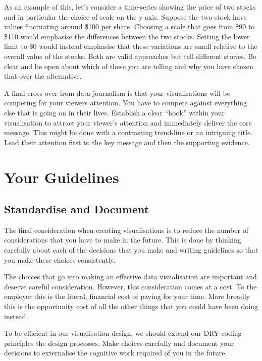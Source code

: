 \documentclass[
  12pt,
]{book}
\begin{document}
As an example of this, let's consider a time-series showing the price of two stocks and in particular the choice of scale on the y-axis. Suppose the two stock have values fluctuating around \$100 per share. Choosing a scale that goes from \$90 to \$110 would emphasise the differences between the two stocks. Setting the lower limit to \$0 would instead emphasise that these variations are small relative to the overall value of the stocks. Both are valid approaches but tell different stories. Be clear and be open about which of these you are telling and why you have chosen that over the alternative.

A final cross-over from data journalism is that your visualisations will be competing for your viewers attention. You have to compete against everything else that is going on in their lives. Establish a clear ``hook'' within your visualisation to attract your viewer's attention and immediately deliver the core message. This might be done with a contrasting trend-line or an intriguing title. Lead their attention first to the key message and then the supporting evidence.

\hypertarget{your-guidelines}{%
\section{Your Guidelines 📝}\label{your-guidelines}}

\hypertarget{standardise-and-document}{%
\subsection{Standardise and Document}\label{standardise-and-document}}

The final consideration when creating visualisations is to reduce the number of considerations that you have to make in the future. This is done by thinking carefully about each of the decisions that you make and writing guidelines so that you make these choices consistently.

The choices that go into making an effective data visualisation are important and deserve careful consideration. However, this consideration comes at a cost. To the employer this is the literal, financial cost of paying for your time. More broadly this is the opportunity cost of all the other things that you could have been doing instead.

To be efficient in our visualisation design, we should extend our DRY coding principles the design processes. Make choices carefully and document your decisions to externalise the cognitive work required of you in the future.
\end{document}
